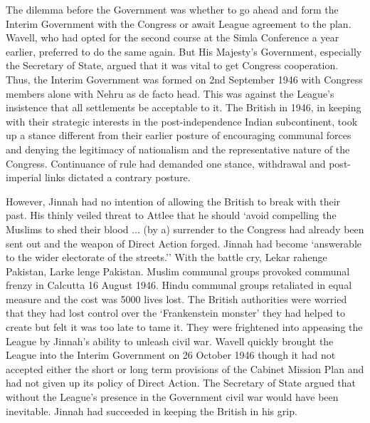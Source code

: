 The dilemma before the Government was whether to go ahead and form the Interim Government with the Congress or await League agreement to the plan. Wavell, who had opted for the second course at the Simla Conference a year earlier, preferred to do the same again. But His Majesty's Government, especially the Secretary of State, argued that it was vital to get Congress cooperation. Thus, the Interim Government was formed on 2nd September 1946 with Congress members alone with Nehru as de facto head. This was against the League's insistence that all settlements be acceptable to it. The British in 1946, in keeping with their strategic interests in the post-independence Indian subcontinent, took up a stance different from their earlier posture of encouraging communal forces and denying the legitimacy of nationalism and the representative nature of the Congress. Continuance of rule had demanded one stance, withdrawal and post-imperial links dictated a contrary posture. 

However, Jinnah had no intention of allowing the British to break with their past. His thinly veiled threat to Attlee that he should `avoid compelling the Muslims to shed their blood ... (by a) surrender to the Congress had already been sent out and the weapon of Direct Action forged. Jinnah had become `answerable to the wider electorate of the streets.'' With the battle cry, Lekar rahenge Pakistan, Larke lenge Pakistan. Muslim communal groups provoked communal frenzy in Calcutta 16 August 1946. Hindu communal groups retaliated in equal measure and the cost was 5000 lives lost. The British authorities were worried that they had lost control over the `Frankenstein monster' they had helped to create but felt it was too late to tame it. They were frightened into appeasing the League by Jinnah's ability to unleash civil war. Wavell quickly brought the League into the Interim Government on 26 October 1946 though it had not accepted either the short or long term provisions of the Cabinet Mission Plan and had not given up its policy of Direct Action. The Secretary of State argued that without the League's presence in the Government civil war would have been inevitable. Jinnah had succeeded in keeping the British in his grip. 

